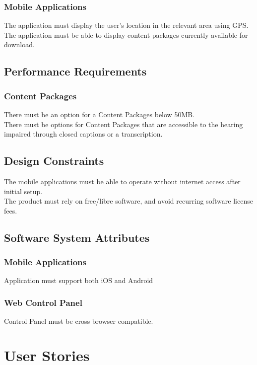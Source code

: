 \documentclass[letterpaper, 10pt,titlepage]{article}
\begin{document}
\subsubsection{Mobile Applications}
The application must display the user's location in the relevant area using GPS.\\
The application must be able to display content packages currently available for download.

\subsection{Performance Requirements}
\subsubsection{Content Packages}
There must be an option for a Content Packages below 50MB.\\
There must be options for Content Packages that are accessible to the hearing impaired through closed captions or a transcription.

\subsection{Design Constraints}
The mobile applications must be able to operate without internet access after initial setup.\\
The product must rely on free/libre software, and avoid recurring software license fees.

\subsection{Software System Attributes}
\subsubsection{Mobile Applications}
Application must support both iOS and Android
\subsubsection{Web Control Panel}
Control Panel must be cross browser compatible.
\vspace{0.5cm}


\section{User Stories}
\end{document}
